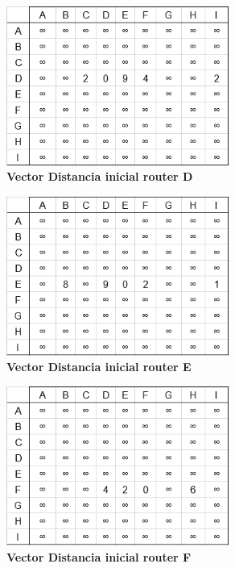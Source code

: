 \documentclass[12pt]{article}
\begin{document}
\begin{figure}[H] 
\centering 
\includegraphics[width=0.65\textwidth]{imagenes/2inicialD.png} \caption{\small \textbf{Vector Distancia inicial router D}}
\label{fig:diagrama_11} 
\end{figure}

\begin{figure}[H] 
\centering 
\includegraphics[width=0.65\textwidth]{imagenes/2inicialE.png} \caption{\small \textbf{Vector Distancia inicial router E}}
\label{fig:diagrama_12} 
\end{figure}

\begin{figure}[H] 
\centering 
\includegraphics[width=0.65\textwidth]{imagenes/2inicialF.png} \caption{\small \textbf{Vector Distancia inicial router F}}
\label{fig:diagrama_13} 
\end{figure}
\end{document}
